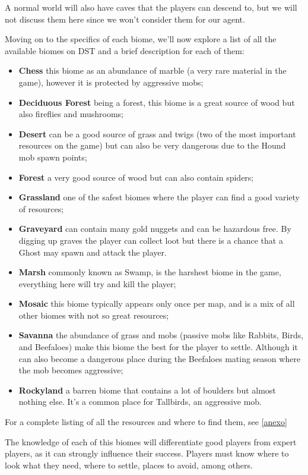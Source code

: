 A normal world will also have caves that the players can descend to, but we will not discuss them here since we won't consider them for our agent.

Moving on to the specifics of each biome, we'll now explore a list of all the available biomes on \ac{DST} and a brief description for each of them:

\begin{itemize}
\item \textbf{Chess} this biome as an abundance of marble (a very rare material in the game), however it is protected by aggressive mobs;
\item \textbf{Deciduous Forest} being a forest, this biome is a great source of wood but also fireflies and mushrooms;
\item \textbf{Desert} can be a good source of grass and twigs (two of the most important resources on the game) but can also be very dangerous due to the Hound mob spawn points;
\item \textbf{Forest} a very good source of wood but can also contain spiders;
\item \textbf{Grassland} one of the safest biomes where the player can find a good variety of resources;
\item \textbf{Graveyard} can contain many gold nuggets and can be hazardous free.
By digging up graves the player can collect loot but there is a chance that a Ghost may spawn and attack the player.
\item \textbf{Marsh} commonly known as Swamp, is the harshest biome in the game, everything here will try and kill the player;
\item \textbf{Mosaic} this biome typically appears only once per map, and is a mix of all other biomes with not so great resources;
\item \textbf{Savanna} the abundance of grass and mobs (passive mobs like Rabbits, Birds, and Beefaloes) make this biome the best for the player to settle.
Although it can also become a dangerous place during the Beefaloes mating season where the mob becomes aggressive;
\item \textbf{Rockyland} a barren biome that contains a lot of boulders but almost nothing else. It’s a common place for Tallbirds, an aggressive mob.
\end{itemize}

For a complete listing of all the resources and where to find them, see \ref{anexo}

The knowledge of each of this biomes will differentiate good players from expert players, as it can strongly influence their success.
Players must know where to look what they need, where to settle, places to avoid, among others.

